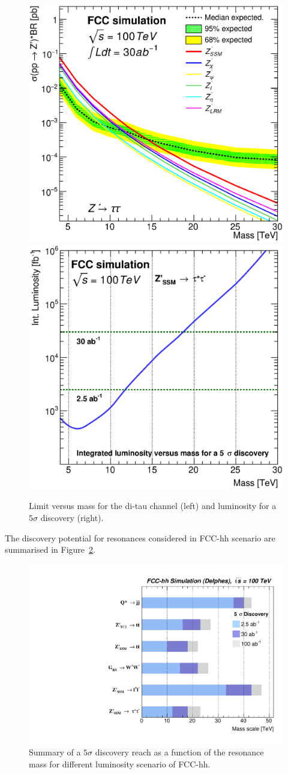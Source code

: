 \documentclass[a4paper,11pt]{article}
\begin{document}
\begin{figure}[!htb]
  \centering
  \includegraphics[width=0.33\columnwidth]{Fig/lim_Zprime_tautau_fcc_v02_allxs.eps}
  \includegraphics[width=0.33\columnwidth]{Fig/DiscoveryPotential_tautau_rootStyle.eps}
  \caption{Limit versus mass for the di-tau channel (left) and luminosity for a $5\sigma$ discovery (right). }
  \label{figure:leptonicresonances:resultstautau}
\end{figure}


The discovery potential for resonances considered in FCC-hh scenario are summarised in Figure~\ref{figure:resonances100:summary}.

\begin{figure}[!htb]
  \centering
  \includegraphics[width=0.90\columnwidth]{Fig/summaryDisco_onlyFCChh.pdf}
  \caption{Summary of a $5\sigma$ discovery reach as a function of the resonance mass for different luminosity scenario of FCC-hh.}
  \label{figure:resonances100:summary}
\end{figure}
\end{document}
